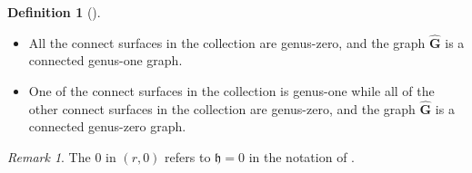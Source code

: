 \documentclass[11pt]{amsart}
\theoremstyle{definition}
\newtheorem{dfn}[dummy]{Definition}
\theoremstyle{remark}
\newtheorem{rmk}[dummy]{Remark}
\newcommand{\<}{\left<}
\renewcommand{\>}{\right>}
\numberwithin{equation}{section}
\def\h{{\mathfrak h}}
\begin{document}
\begin{dfn}[{\cite[Definition 4.3]{TZ1}}]
\begin{itemize}
        \begin{itemize}
            \item All the connect surfaces in the collection are genus-zero, and the graph $\hat{\mathbf{G}}$ is a connected genus-one graph.
            \item One of the connect surfaces in the collection %
is genus-one while %
all of the other connect surfaces in the collection are genus-zero, and the graph $\hat{\mathbf{G}}$ is a connected genus-zero graph.
        \end{itemize}
    \end{itemize}
   
    
\end{dfn}

\begin{rmk}
    The $0$ in $(r,0)$ refers to $\h=0$ in the notation of \cite{TZ1,TZ2}.
\end{rmk}
\end{document}
